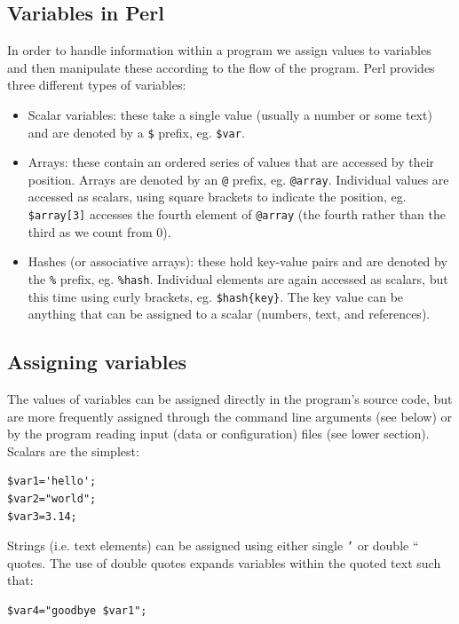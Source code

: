 \documentclass[11pt]{article}
\begin{document}
\subsection{Variables in Perl}
\label{sec-5-1}


In order to handle information within a program we assign values to
variables and then manipulate these according to the flow of the
program. Perl provides three different types of variables:

\begin{itemize}
\item Scalar variables: these take a single value (usually a number or some text) 
   and are denoted by a \texttt{\$} prefix, eg. \texttt{\$var}.
\item Arrays: these contain an ordered series of values that are accessed by their
   position. Arrays are denoted by an \texttt{@} prefix, eg. \texttt{@array}.
   Individual values are accessed as scalars, using square brackets to
   indicate the position, eg. \texttt{\$array[3]} accesses the fourth element of
   \texttt{@array} (the fourth rather than the third as we count from 0).
\item Hashes (or associative arrays): these hold key-value pairs and are
   denoted by the \texttt{\%} prefix, eg. \texttt{\%hash}. Individual elements are again
   accessed as scalars, but this time using curly brackets, eg.
   \texttt{\$hash\{key\}}. The key value can be anything that can be assigned to a
   scalar (numbers, text, and references).
\end{itemize}
\subsection{Assigning variables}
\label{sec-5-2}


The values of variables can be assigned directly in the program's source
code, but are more frequently assigned through the command line
arguments (see below) or by the program reading input (data or
configuration) files (see lower section). Scalars are the simplest:


\begin{verbatim}
$var1='hello'; 
$var2="world";
$var3=3.14;
\end{verbatim}

Strings (i.e. text elements) can be assigned using either single \texttt{’} or
double `` quotes. The use of double quotes expands variables within the
quoted text such that:


\begin{verbatim}
$var4="goodbye $var1";
\end{verbatim}
\end{document}
